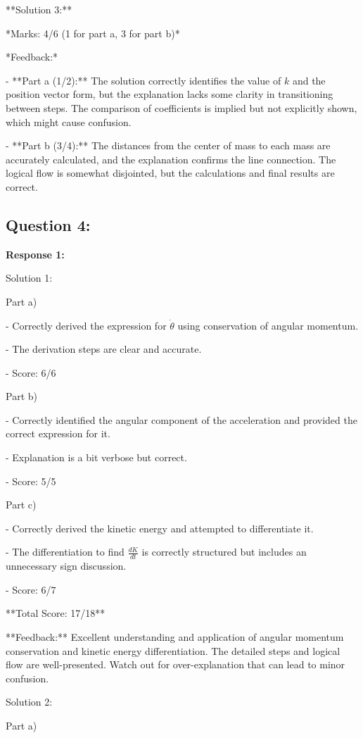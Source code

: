\documentclass[a4paper,11pt]{article}
\begin{document}
**Solution 3:**

*Marks: 4/6 (1 for part a, 3 for part b)*

*Feedback:*

- **Part a (1/2):** The solution correctly identifies the value of \( k \) and the position vector form, but the explanation lacks some clarity in transitioning between steps. The comparison of coefficients is implied but not explicitly shown, which might cause confusion.

- **Part b (3/4):** The distances from the center of mass to each mass are accurately calculated, and the explanation confirms the line connection. The logical flow is somewhat disjointed, but the calculations and final results are correct.

\subsection*{Question 4:}

\textbf{Response 1:}

Solution 1:

Part a)

- Correctly derived the expression for \( \dot{\theta} \) using conservation of angular momentum.

- The derivation steps are clear and accurate.

- Score: 6/6

Part b)

- Correctly identified the angular component of the acceleration and provided the correct expression for it.

- Explanation is a bit verbose but correct.

- Score: 5/5

Part c)

- Correctly derived the kinetic energy and attempted to differentiate it.

- The differentiation to find \( \frac{dK}{dt} \) is correctly structured but includes an unnecessary sign discussion.

- Score: 6/7

**Total Score: 17/18**

**Feedback:** Excellent understanding and application of angular momentum conservation and kinetic energy differentiation. The detailed steps and logical flow are well-presented. Watch out for over-explanation that can lead to minor confusion.

Solution 2:

Part a)
\end{document}
